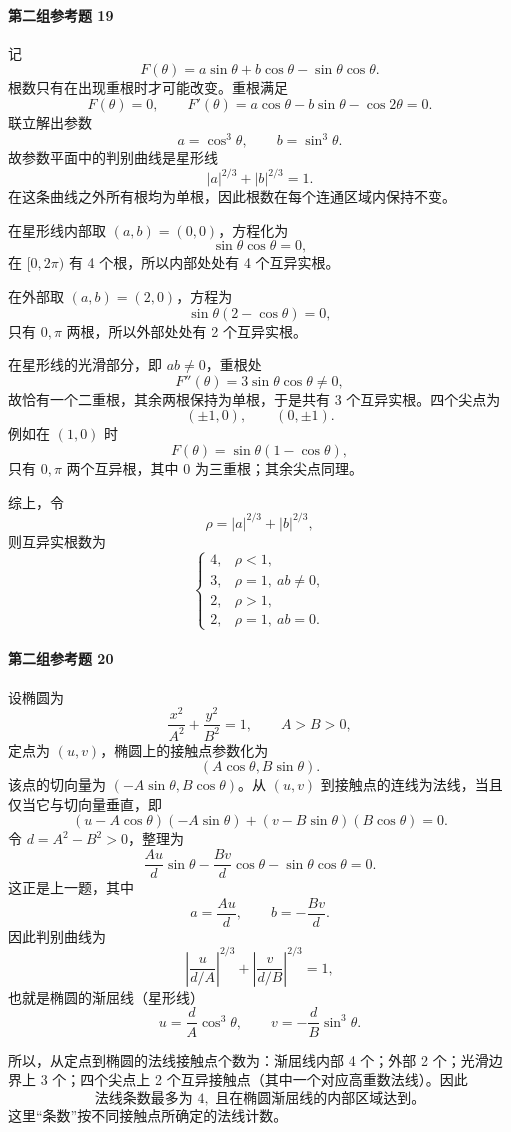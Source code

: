 \paragraph{第二组参考题 19}
\begin{xsolution}
记
\[
  F(\theta)=a\sin\theta+b\cos\theta-\sin\theta\cos\theta.
\]
根数只有在出现重根时才可能改变。重根满足
\[
  F(\theta)=0,
  \qquad
  F'(\theta)=a\cos\theta-b\sin\theta-\cos2\theta=0.
\]
联立解出参数
\[
  a=\cos^3\theta,
  \qquad
  b=\sin^3\theta.
\]
故参数平面中的判别曲线是星形线
\[
  |a|^{2/3}+|b|^{2/3}=1.
\]
在这条曲线之外所有根均为单根，因此根数在每个连通区域内保持不变。

在星形线内部取 $(a,b)=(0,0)$，方程化为
\[
  \sin\theta\cos\theta=0,
\]
在 $[0,2\pi)$ 有 4 个根，所以内部处处有 4 个互异实根。

在外部取 $(a,b)=(2,0)$，方程为
\[
  \sin\theta(2-\cos\theta)=0,
\]
只有 $0,\pi$ 两根，所以外部处处有 2 个互异实根。

在星形线的光滑部分，即 $ab\ne0$，重根处
\[
  F''(\theta)=3\sin\theta\cos\theta\ne0,
\]
故恰有一个二重根，其余两根保持为单根，于是共有 3 个互异实根。四个尖点为
\[
  (\pm1,0),\qquad(0,\pm1).
\]
例如在 $(1,0)$ 时
\[
  F(\theta)=\sin\theta(1-\cos\theta),
\]
只有 $0,\pi$ 两个互异根，其中 $0$ 为三重根；其余尖点同理。

综上，令
\[
  \rho=|a|^{2/3}+|b|^{2/3},
\]
则互异实根数为
\[
  \boxed{
  \begin{cases}
    4,&\rho<1,\\
    3,&\rho=1,\ ab\ne0,\\
    2,&\rho>1,\\
    2,&\rho=1,\ ab=0.
  \end{cases}}
\]
\end{xsolution}

\paragraph{第二组参考题 20}
\begin{xsolution}
设椭圆为
\[
  \frac{x^2}{A^2}+\frac{y^2}{B^2}=1,
  \qquad A>B>0,
\]
定点为 $(u,v)$，椭圆上的接触点参数化为
\[
  (A\cos\theta,B\sin\theta).
\]
该点的切向量为 $(-A\sin\theta,B\cos\theta)$。从 $(u,v)$ 到接触点的连线为法线，当且仅当它与切向量垂直，即
\[
  (u-A\cos\theta)(-A\sin\theta)
  +(v-B\sin\theta)(B\cos\theta)=0.
\]
令 $d=A^2-B^2>0$，整理为
\[
  \frac{Au}{d}\sin\theta
  -\frac{Bv}{d}\cos\theta
  -\sin\theta\cos\theta=0.
\]
这正是上一题，其中
\[
  a=\frac{Au}{d},
  \qquad
  b=-\frac{Bv}{d}.
\]
因此判别曲线为
\[
  \left|\frac{u}{d/A}\right|^{2/3}
  +\left|\frac{v}{d/B}\right|^{2/3}=1,
\]
也就是椭圆的渐屈线（星形线）
\[
  u=\frac dA\cos^3\theta,
  \qquad
  v=-\frac dB\sin^3\theta.
\]

所以，从定点到椭圆的法线接触点个数为：渐屈线内部 4 个；外部 2 个；光滑边界上 3 个；四个尖点上 2 个互异接触点（其中一个对应高重数法线）。因此
\[
  \boxed{\text{法线条数最多为 }4,\text{ 且在椭圆渐屈线的内部区域达到。}}
\]
这里“条数”按不同接触点所确定的法线计数。
\end{xsolution}
